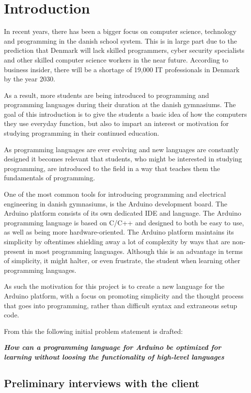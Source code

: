 
\chapter{Introduction}
In recent years, there has been a bigger focus on computer science, technology and programming in the danish school system.
This is in large part due to the prediction that Denmark will lack skilled programmers, cyber security specialists and other skilled computer science workers in the near future.
According to business insider, there will be a shortage of 19,000 IT professionals in Denmark by the year 2030.\cite{ITLackDK}

As a result, more students are being introduced to programming and programming languages during their duration at the
danish gymnasiums. 
The goal of this introduction is to give the students a basic idea of how the computers they use everyday function, but also to impart an interest or motivation for studying programming in their continued education.

As programming languages are ever evolving and new languages are constantly designed it becomes relevant
that students, who might be interested in studying programming, are introduced to the field in a way that
teaches them the fundamentals of programming.

One of the most common tools for introducing programming and electrical engineering in danish gymnasiums, is
the Arduino development board. The Arduino platform consists of its own dedicated IDE and language.
The Arduino programming language is based on C/C++ and designed to both be easy to use, as well as being
more hardware-oriented.\cite{ArFAQ}
The Arduino platform maintains its simplicity by oftentimes shielding away a lot of complexity by ways
that are non-present in most programming languages.
Although this is an advantage in terms of simplicity, it might halter, or even frustrate, the student when learning other programming languages.

As such the motivation for this project is to create a new language for the Arduino platform, with a focus on promoting simplicity and the thought process that goes into programming, rather than difficult syntax and extraneous setup code.


From this the following initial problem statement is drafted:

\begin{center}
	\textit{\textbf{How can a programming language for Arduino be optimized for learning without 
			loosing the functionality of high-level languages}}
\end{center}

\section{Preliminary interviews with the client}
